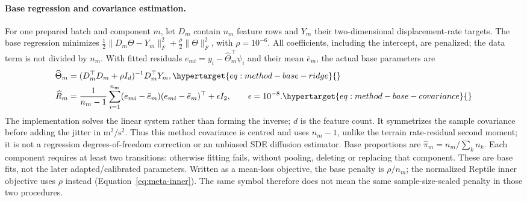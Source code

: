 \paragraph{Base regression and covariance estimation.}
\label{sec:method-base-fit}\hypertarget{sec:method-base-fit}{}
For one prepared batch and component \(m\), let \(D_m\) contain \(n_m\)
feature rows and \(Y_m\) their two-dimensional displacement-rate targets.
The base regression minimizes
\(\tfrac12\|D_m\Theta-Y_m\|_F^2+\tfrac\rho2\|\Theta\|_F^2\),
with \(\rho=10^{-6}\). All coefficients, including the intercept, are
penalized; the data term is not divided by \(n_m\). With fitted residuals
\(e_{mi}=y_i-\widehat\Theta_m^\top\psi_i\) and their mean \(\bar e_m\),
the actual base parameters are
\begin{align}
 \widehat\Theta_m&=(D_m^\top D_m+\rho I_d)^{-1}D_m^\top Y_m,
 \label{eq:method-base-ridge}\hypertarget{eq:method-base-ridge}{}\\
 \widehat R_m&=\frac1{n_m-1}\sum_{i=1}^{n_m}
 (e_{mi}-\bar e_m)(e_{mi}-\bar e_m)^\top+\epsilon I_2,
 \qquad \epsilon=10^{-8}.
 \label{eq:method-base-covariance}\hypertarget{eq:method-base-covariance}{}
\end{align}
The implementation solves the linear system rather than forming the inverse;
\(d\) is the feature count. It symmetrizes the sample covariance before adding
the jitter in \(\mathrm{m}^2/\mathrm{s}^2\). Thus this method covariance is
centred and uses \(n_m-1\), unlike the terrain rate-residual second moment;
it is not a regression degrees-of-freedom correction or an unbiased SDE
diffusion estimator. Base proportions are \(\widehat\pi_m=n_m/\sum_k n_k\).
Each component requires at least two transitions: otherwise fitting fails,
without pooling, deleting or replacing that component. These are base fits,
not the later adapted/calibrated parameters. Written as a mean-loss objective,
the base penalty is \(\rho/n_m\); the normalized Reptile inner objective uses
\(\rho\) instead (Equation~\eqref{eq:meta-inner}). The same symbol therefore
does not mean the same sample-size-scaled penalty in those two procedures.

